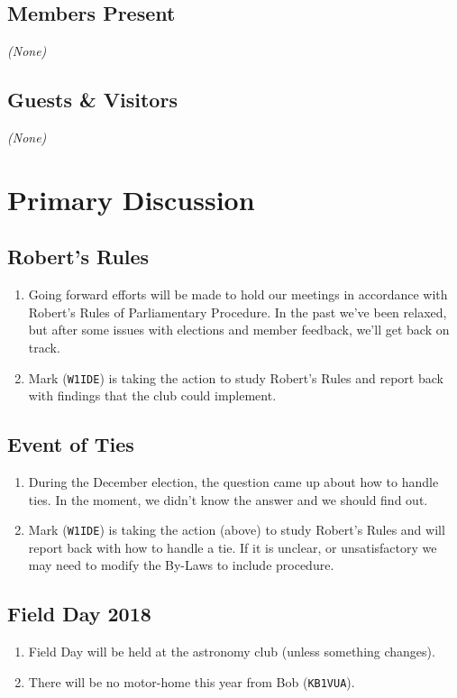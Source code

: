 \documentclass[10pt,letterpaper]{article}
\begin{document}
\subsection{Members Present}
\emph{(None)}

\subsection{Guests \& Visitors}
\emph{(None)}

\section{Primary Discussion}

\subsection{Robert's Rules}
\begin{enumerate}
  \item Going forward efforts will be made to hold our meetings in accordance with Robert's Rules of Parliamentary Procedure. In the past we've been relaxed, but after some issues with elections and member feedback, we'll get back on track.
  \item Mark (\texttt{W1IDE}) is taking the action to study Robert's Rules and report back with findings that the club could implement.
\end{enumerate}

\subsection{Event of Ties}
\begin{enumerate}
  \item During the December election, the question came up about how to handle ties. In the moment, we didn't know the answer and we should find out.
  \item Mark (\texttt{W1IDE}) is taking the action (above) to study Robert's Rules and will report back with how to handle a tie. If it is unclear, or unsatisfactory we may need to modify the By-Laws to include procedure.
\end{enumerate}

\subsection{Field Day 2018}
\begin{enumerate}
  \item Field Day will be held at the astronomy club (unless something changes).
  \item There will be no motor-home this year from Bob (\texttt{KB1VUA}).
\end{enumerate}
\end{document}
